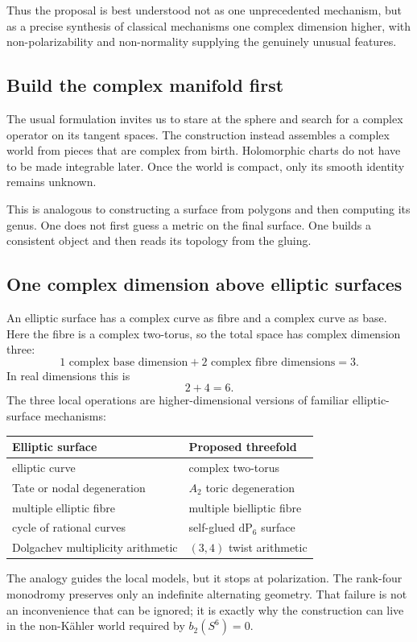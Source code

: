 \documentclass[11pt,reqno]{amsart}
\numberwithin{equation}{section}
\newcommand{\dP}{\mathrm{dP}_6}
\theoremstyle{definition}
\begin{document}
Thus the proposal is best understood not as one unprecedented mechanism, but as a precise synthesis of classical mechanisms one complex dimension higher, with non-polarizability and non-normality supplying the genuinely unusual features.

\subsection{Build the complex manifold first}

The usual formulation invites us to stare at the sphere and search for a complex operator on its tangent spaces. The construction instead assembles a complex world from pieces that are complex from birth. Holomorphic charts do not have to be made integrable later. Once the world is compact, only its smooth identity remains unknown.

This is analogous to constructing a surface from polygons and then computing its genus. One does not first guess a metric on the final surface. One builds a consistent object and then reads its topology from the gluing.

\subsection{One complex dimension above elliptic surfaces}

An elliptic surface has a complex curve as fibre and a complex curve as base. Here the fibre is a complex two-torus, so the total space has complex dimension three:
\[
1\text{ complex base dimension}+2\text{ complex fibre dimensions}=3.
\]
In real dimensions this is
\[
2+4=6.
\]
The three local operations are higher-dimensional versions of familiar elliptic-surface mechanisms:
\begin{center}
\begin{tabular}{@{}ll@{}}
\toprule
Elliptic surface & Proposed threefold\\
\midrule
elliptic curve & complex two-torus\\
Tate or nodal degeneration & $A_2$ toric degeneration\\
multiple elliptic fibre & multiple bielliptic fibre\\
cycle of rational curves & self-glued $\dP$ surface\\
Dolgachev multiplicity arithmetic & $(3,4)$ twist arithmetic\\
\bottomrule
\end{tabular}
\end{center}
The analogy guides the local models, but it stops at polarization. The rank-four monodromy preserves only an indefinite alternating geometry. That failure is not an inconvenience that can be ignored; it is exactly why the construction can live in the non-K\"ahler world required by $b_2(S^6)=0$.
\end{document}
